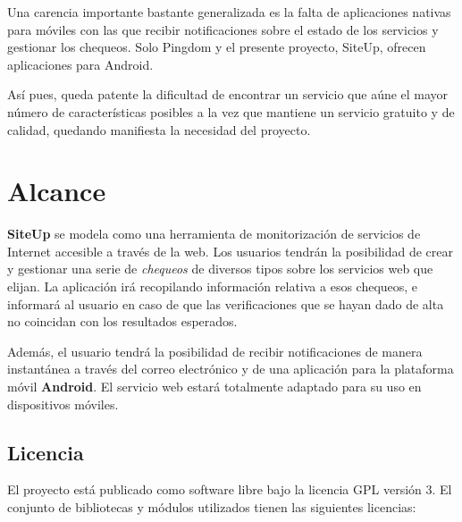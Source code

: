 Una carencia importante bastante generalizada es la falta de aplicaciones
nativas para móviles con las que recibir notificaciones sobre el estado de los
servicios y gestionar los chequeos. Solo Pingdom y el presente proyecto, SiteUp,
ofrecen aplicaciones para Android.

Así pues, queda patente la dificultad de encontrar un servicio que aúne el mayor
número de características posibles a la vez que mantiene un servicio gratuito y
de calidad, quedando manifiesta la necesidad del proyecto.


\section{Alcance}
\textbf{SiteUp} se modela como una herramienta de monitorización de servicios de
Internet accesible a través de la web. Los usuarios tendrán la posibilidad de
crear y gestionar una serie de \textit{chequeos} de diversos tipos sobre los
servicios web que elijan. La aplicación irá recopilando información relativa a
esos chequeos, e informará al usuario en caso de que las verificaciones que se
hayan dado de alta no coincidan con los resultados esperados.

Además, el usuario tendrá la posibilidad de recibir notificaciones de manera
instantánea a través del correo electrónico y de una aplicación para la
plataforma móvil \textbf{Android}. El servicio web estará totalmente adaptado
para su uso en dispositivos móviles.



\subsection{Licencia}
El proyecto está publicado como software libre bajo la licencia
\ac{GPL} versión 3. El conjunto de bibliotecas y módulos utilizados
tienen las siguientes licencias:

